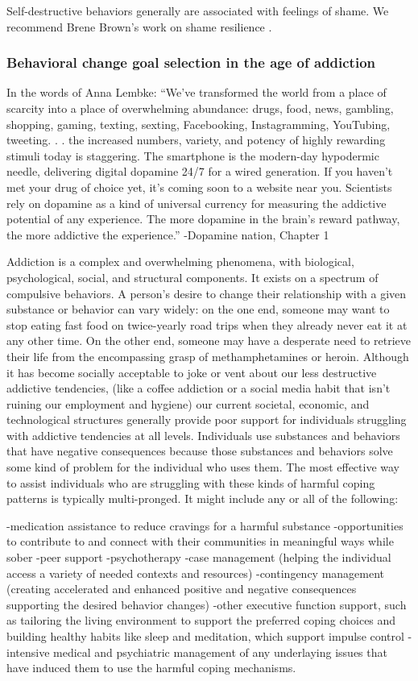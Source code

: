 \documentclass[12pt,letterpaper]{article}
\begin{document}
Self-destructive behaviors generally are associated with feelings of shame. We recommend Brene Brown's work on shame resilience \cite{brownThought}.

\subsubsection*{Behavioral change goal selection in the age of addiction}

In the words of Anna Lembke: “We've transformed the world from a place of scarcity into a place of overwhelming abundance: drugs, food, news, gambling, shopping, gaming, texting, sexting, Facebooking, Instagramming, YouTubing, tweeting. . . the increased numbers, variety, and potency of highly rewarding stimuli today is staggering. The smartphone is the modern-day hypodermic needle, delivering digital dopamine 24/7 for a wired generation. If you haven't met your drug of choice yet, it's coming soon to a website near you. Scientists rely on dopamine as a kind of universal currency for measuring the addictive potential of any experience. The more dopamine in the brain's reward pathway, the more addictive the experience.” -Dopamine nation, Chapter 1

Addiction is a complex and overwhelming phenomena, with biological, psychological, social, and structural components. It exists on a spectrum of compulsive behaviors. A person's desire to change their relationship with a given substance or behavior can vary widely: on the one end, someone may want to stop eating fast food on twice-yearly road trips when they already never eat it at any other time. On the other end, someone may have a desperate need to retrieve their life from the encompassing grasp of methamphetamines or heroin. Although it has become socially acceptable to joke or vent about our less destructive addictive tendencies, (like a coffee addiction or a social media habit that isn't ruining our employment and hygiene) our current societal, economic, and technological structures generally provide poor support for individuals struggling with addictive tendencies at all levels. Individuals use substances and behaviors that have negative consequences because those substances and behaviors solve some kind of problem for the individual who uses them. The most effective way to assist individuals who are struggling with these kinds of harmful coping patterns is typically multi-pronged. It might include any or all of the following:

-medication assistance to reduce cravings for a harmful substance
-opportunities to contribute to and connect with their communities in meaningful ways while sober
-peer support
-psychotherapy
-case management (helping the individual access a variety of needed contexts and resources)
-contingency management (creating accelerated and enhanced positive and negative consequences supporting the desired behavior changes) 
-other executive function support, such as tailoring the living environment to support the preferred coping choices and building healthy habits like sleep and meditation, which support impulse control
-intensive medical and psychiatric management of any underlaying issues that have induced them to use the harmful coping mechanisms.
\end{document}
